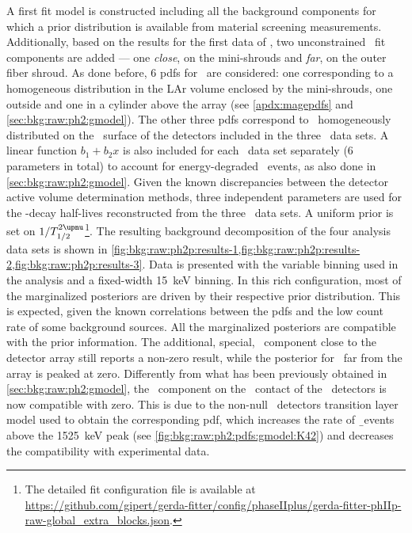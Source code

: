 A first fit model is constructed including all the background components for which a prior
distribution is available from material screening measurements. Additionally, based on the
results for the first data of \phasetwo, two unconstrained \kvn\ fit
components are added --- one \emph{close}, on the mini-shrouds and \emph{far}, on the
outer fiber shroud. As done before, 6 pdfs for \kvz\ are considered: one corresponding to
a homogeneous distribution in the LAr volume enclosed by the mini-shrouds, one outside and
one in a cylinder above the array (see \cref{apdx:magepdfs} and
\cref{sec:bkg:raw:ph2:gmodel}). The other three pdfs correspond to \kvz\ homogeneously
distributed on the \nplus\ surface of the detectors included in the three \Mone\ data
sets. A linear function $b_1+b_2x$ is also included for each \Mone\ data set
separately (6 parameters in total) to account for energy-degraded \a\ events, as also
done in \cref{sec:bkg:raw:ph2:gmodel}. Given the known discrepancies between the detector
active volume determination methods, three independent parameters are used for the
\nnbb-decay half-lives reconstructed from the three \Mone\ data sets. A uniform prior is
set on $1/\thalftwoM$\footnote{%
  The detailed fit configuration file is available at
  \url{https://github.com/gipert/gerda-fitter/config/phaseIIplus/gerda-fitter-phIIp-raw-global_extra_blocks.json}.
}.
\newpar
The resulting background decomposition of the four analysis data sets is shown in
\cref{fig:bkg:raw:ph2p:results-1,fig:bkg:raw:ph2p:results-2,fig:bkg:raw:ph2p:results-3}.
Data is presented with the variable binning used in the analysis and a fixed-width 15~keV
binning. In this rich configuration, most of the marginalized posteriors are driven by
their respective prior distribution. This is expected, given the known correlations
between the pdfs and the low count rate of some background sources. All the marginalized
posteriors are compatible with the prior information. The additional, special, \kvn\
component close to the detector array still reports a non-zero result, while the posterior
for \kvn\ far from the array is peaked at zero.  Differently from what has been previously
obtained in \cref{sec:bkg:raw:ph2:gmodel}, the \kvz\ component on the \nplus\ contact of
the \bege\ detectors is now compatible with zero. This is due to the non-null \bege\
detectors transition layer model used to obtain the corresponding pdf, which increases the
rate of \b\ events above the 1525~keV peak (see \cref{fig:bkg:raw:ph2:pdfs:gmodel:K42})
and decreases the compatibility with experimental data.

